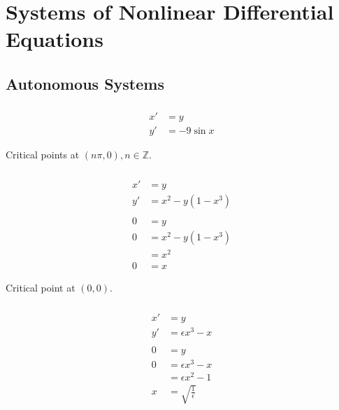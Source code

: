 \documentclass{article}
\begin{document}
\section{Systems of Nonlinear Differential Equations}

\subsection{Autonomous Systems}

\subsubsection{}

\begin{align*}
  x' & = y         \\
  y' & = -9 \sin x
\end{align*}

Critical points at $(n \pi, 0), n \in \mathbb{Z}$.

\setcounter{subsubsection}{2}
\subsubsection{}

\begin{align*}
  x' & = y                 \\
  y' & = x^2 - y (1 - x^3) \\ \\
  0  & = y                 \\
  0  & = x^2 - y (1 - x^3) \\
     & = x^2               \\
  0  & = x
\end{align*}

Critical point at $(0, 0)$.

\setcounter{subsubsection}{4}
\subsubsection{}

\begin{align*}
  x' & = y                         \\
  y' & = \epsilon x^3 - x          \\ \\
  0  & = y                         \\
  0  & = \epsilon x^3 - x          \\
     & = \epsilon x^2 - 1          \\
  x  & = \sqrt{\frac{1}{\epsilon}}
\end{align*}
\end{document}
